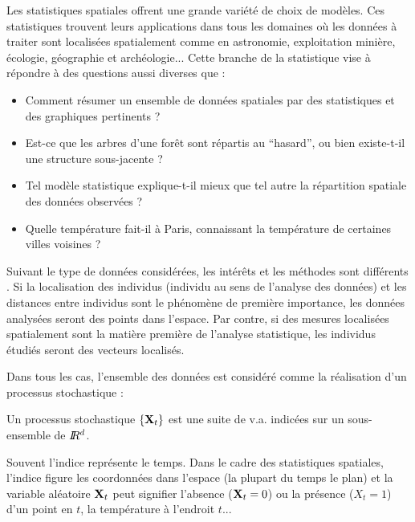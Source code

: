 Les statistiques spatiales offrent une grande vari\'et\'e de choix de mod\`eles.
Ces statistiques trouvent leurs applications dans tous les
domaines o\`u les donn\'ees \`a traiter sont localis\'ees spatialement comme
en astronomie, exploitation mini\`ere, \'ecologie,  g\'eographie et
arch\'eologie... Cette branche de la statistique vise \`a r\'epondre \`a
des questions aussi diverses que :
\begin{itemize}
\item  Comment r\'esumer un ensemble de donn\'ees spatiales par des statistiques
et des graphiques pertinents ?
\item Est-ce que les arbres d'une for\^et sont r\'epartis au ``hasard'', ou
bien existe-t-il une structure sous-jacente  ?
\item Tel mod\`ele statistique explique-t-il mieux que tel autre la 
r\'epartition spatiale des donn\'ees observ\'ees  ?
\item Quelle temp\'erature fait-il \`a Paris, connaissant la temp\'erature 
de certaines villes voisines  ?
\end{itemize}

Suivant le type de donn\'ees consid\'er\'ees, les int\'er\^ets et les
m\'ethodes sont diff\'erents \cite{Ripley1982}. 
Si la localisation des individus 
(individu au sens de l'analyse des donn\'ees) et les distances entre
individus sont le ph\'enom\`ene
de premi\`ere importance, les donn\'ees analys\'ees seront des 
points dans l'espace. Par contre, si  des mesures localis\'ees
spatialement sont la mati\`ere premi\`ere
de l'analyse statistique, les individus \'etudi\'es seront des 
vecteurs localis\'es.

Dans tous les cas, l'ensemble des donn\'ees est consid\'er\'e comme la
r\'ealisation d'un processus stochastique :
\begin{defi}
Un processus stochastique $\{\mbox{\bf X}_t\}$ est une suite de v.a. indic\'ees sur un 
sous-ensemble de $I\!\!R^d$.
\end{defi}

Souvent l'indice repr\'esente le temps. Dans
le cadre des statistiques spatiales, l'indice figure les coordonn\'ees
dans l'espace (la plupart du temps le plan) et la variable al\'eatoire $\mbox{\bf X}_t$
peut signifier l'absence ($\mbox{\bf X}_t=0$) ou la pr\'esence ($X_t=1$) d'un point en $t$, 
la temp\'erature \`a l'endroit $t$...
 

